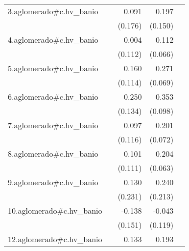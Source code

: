{\begin{longtable}{l*{4}{D{.}{.}{-1}}}
\addlinespace
3.aglomerado#c.hv\_banio&                     &       0.091         &       0.197         &                     \\
            &                     &     (0.176)         &     (0.150)         &                     \\
\addlinespace
4.aglomerado#c.hv\_banio&                     &       0.004         &       0.112         &                     \\
            &                     &     (0.112)         &     (0.066)         &                     \\
\addlinespace
5.aglomerado#c.hv\_banio&                     &       0.160         &       0.271\sym{***}&                     \\
            &                     &     (0.114)         &     (0.069)         &                     \\
\addlinespace
6.aglomerado#c.hv\_banio&                     &       0.250         &       0.353\sym{***}&                     \\
            &                     &     (0.134)         &     (0.098)         &                     \\
\addlinespace
7.aglomerado#c.hv\_banio&                     &       0.097         &       0.201\sym{**} &                     \\
            &                     &     (0.116)         &     (0.072)         &                     \\
\addlinespace
8.aglomerado#c.hv\_banio&                     &       0.101         &       0.204\sym{**} &                     \\
            &                     &     (0.111)         &     (0.063)         &                     \\
\addlinespace
9.aglomerado#c.hv\_banio&                     &       0.130         &       0.240         &                     \\
            &                     &     (0.231)         &     (0.213)         &                     \\
\addlinespace
10.aglomerado#c.hv\_banio&                     &      -0.138         &      -0.043         &                     \\
            &                     &     (0.151)         &     (0.119)         &                     \\
\addlinespace
12.aglomerado#c.hv\_banio&                     &       0.133         &       0.193         &                     \\

\end{longtable}}
